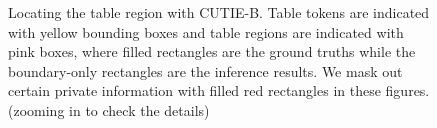 \documentclass[10pt,twocolumn,letterpaper]{article}
\begin{document}
\begin{figure}
\begin{center}
\end{center}
   \caption{Locating the table region with CUTIE-B. Table tokens are indicated with yellow bounding boxes and table regions are indicated with pink boxes, where filled rectangles are the ground truths while the boundary-only rectangles are the inference results. We mask out certain private information with filled red rectangles in these figures. (zooming in to check the details)}
\label{fig:table}
\end{figure}
\end{document}
